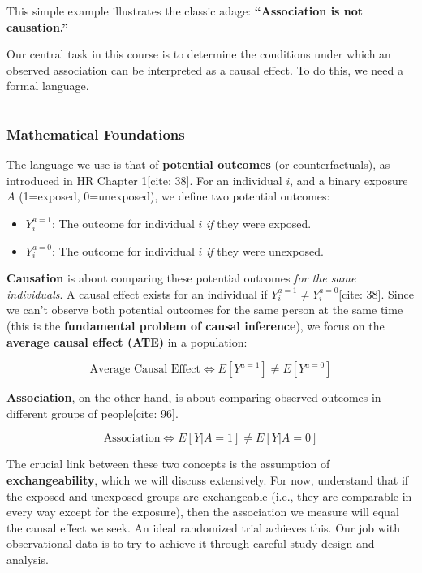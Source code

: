 \documentclass[
  10pt,
  letterpaper,
  DIV=11,
  numbers=noendperiod]{scrartcl}
\providecommand{\tightlist}{%
  \setlength{\itemsep}{0pt}\setlength{\parskip}{0pt}}
\begin{document}
This simple example illustrates the classic adage: \textbf{``Association
is not causation.''}

Our central task in this course is to determine the conditions under
which an observed association can be interpreted as a causal effect. To
do this, we need a formal language.

\begin{center}\rule{0.5\linewidth}{0.5pt}\end{center}

\subsubsection{Mathematical Foundations}\label{mathematical-foundations}

The language we use is that of \textbf{potential outcomes} (or
counterfactuals), as introduced in HR Chapter 1{[}cite: 38{]}. For an
individual \(i\), and a binary exposure \(A\) (1=exposed, 0=unexposed),
we define two potential outcomes:

\begin{itemize}
\tightlist
\item
  \(Y_i^{a=1}\): The outcome for individual \(i\) \emph{if} they were
  exposed.
\item
  \(Y_i^{a=0}\): The outcome for individual \(i\) \emph{if} they were
  unexposed.
\end{itemize}

\textbf{Causation} is about comparing these potential outcomes \emph{for
the same individuals}. A causal effect exists for an individual if
\(Y_i^{a=1} \neq Y_i^{a=0}\){[}cite: 38{]}. Since we can't observe both
potential outcomes for the same person at the same time (this is the
\textbf{fundamental problem of causal inference}), we focus on the
\textbf{average causal effect (ATE)} in a population:

\[
\text{Average Causal Effect} \iff E[Y^{a=1}] \neq E[Y^{a=0}]
\]

\textbf{Association}, on the other hand, is about comparing observed
outcomes in different groups of people{[}cite: 96{]}.

\[
\text{Association} \iff E[Y|A=1] \neq E[Y|A=0]
\]

The crucial link between these two concepts is the assumption of
\textbf{exchangeability}, which we will discuss extensively. For now,
understand that if the exposed and unexposed groups are exchangeable
(i.e., they are comparable in every way except for the exposure), then
the association we measure will equal the causal effect we seek. An
ideal randomized trial achieves this. Our job with observational data is
to try to achieve it through careful study design and analysis.
\end{document}
